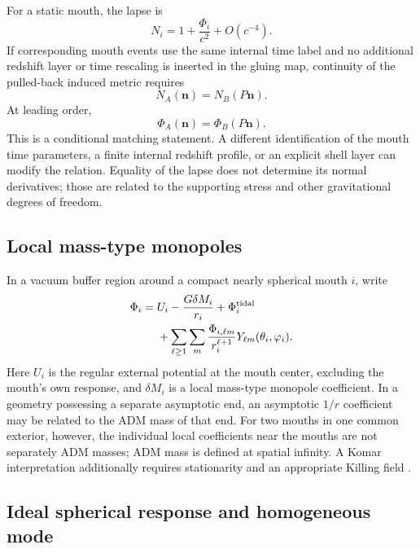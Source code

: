 \documentclass[journal,a4paper]{IEEEtran}
\begin{document}
For a static mouth, the lapse is
\begin{equation}
    N_i=1+\frac{\Phi_i}{c^2}+O(c^{-4}).
\end{equation}
If corresponding mouth events use the same internal time label and no additional redshift layer or time rescaling is inserted in the gluing map, continuity of the pulled-back induced metric requires
\begin{equation}
    N_A(\mathbf n)=N_B(P\mathbf n).
\end{equation}
At leading order,
\begin{equation}
    \Phi_A(\mathbf n)=\Phi_B(P\mathbf n).
    \label{eq:weak_lapse_matching}
\end{equation}
This is a conditional matching statement. A different identification of the mouth time parameters, a finite internal redshift profile, or an explicit shell layer can modify the relation. Equality of the lapse does not determine its normal derivatives; those are related to the supporting stress and other gravitational degrees of freedom.

\subsection{Local mass-type monopoles}

In a vacuum buffer region around a compact nearly spherical mouth \(i\), write
\begin{equation}
\begin{split}
    \Phi_i={}&U_i
    -\frac{G\delta M_i}{r_i}
    +\Phi_i^{\rm tidal}\\
    &+\sum_{\ell\geq1}\sum_m
    \frac{\Phi_{i,\ell m}}{r_i^{\ell+1}}
    Y_{\ell m}(\theta_i,\varphi_i).
    \label{eq:buffer_expansion}
\end{split}
\end{equation}
Here \(U_i\) is the regular external potential at the mouth center, excluding the mouth's own response, and \(\delta M_i\) is a local mass-type monopole coefficient. In a geometry possessing a separate asymptotic end, an asymptotic \(1/r\) coefficient may be related to the ADM mass of that end. For two mouths in one common exterior, however, the individual local coefficients near the mouths are not separately ADM masses; ADM mass is defined at spatial infinity. A Komar interpretation additionally requires stationarity and an appropriate Killing field \cite{Wald1984,PoissonToolkit}.

\subsection{Ideal spherical response and homogeneous mode}
\end{document}
